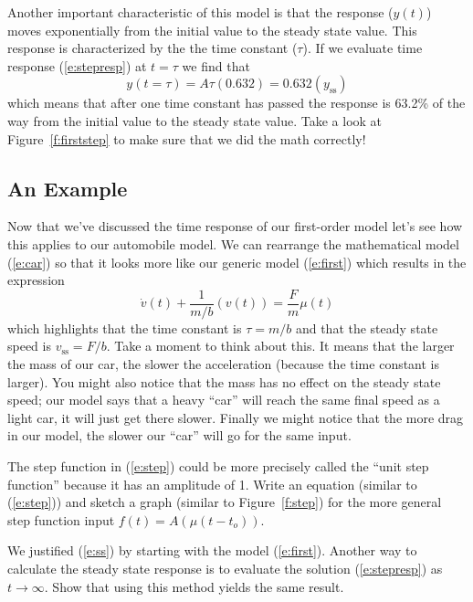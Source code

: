 Another important characteristic of this model is that the response ($y(t)$) moves exponentially from the initial value to the steady state value.  This response is characterized by the the \gls{time constant} ($\tau$).  If we evaluate time response (\ref{e:stepresp}) at $t=\tau$ we find that
\[
y(t=\tau) = A \tau (0.632) = 0.632 (y_{\mathrm{ss}})
\]
which means that after one time constant has passed the response is 63.2\% of the way from the initial value to the steady state value.  Take a look at Figure~\ref{f:firststep} to make sure that we did the math correctly!

\subsection{An Example}
Now that we've discussed the time response of our first-order model let's see how this applies to our automobile model.  We can rearrange the mathematical model (\ref{e:car}) so that it looks more like our generic model (\ref{e:first}) which results in the expression
\begin{equation}\label{e:car2}
\dot{v}(t) + \frac{1}{m/b}(v(t)) = \frac{F}{m}\mu(t)
\end{equation}
which highlights that the time constant is $\tau=m/b$ and that the steady state speed is $v_{\mathrm{ss}}=F/b$.  Take a moment to think about this.  It means that the larger the mass of our car, the slower the acceleration (because the time constant is larger).  You might also notice that the mass has no effect on the steady state speed; our model says that a heavy ``car'' will reach the same final speed as a light car, it will just get there slower.  Finally we might notice that the more drag in our model, the slower our ``car'' will go for the same input.   

\begin{ex}
The step function in (\ref{e:step}) could be more precisely called the ``unit step function'' because it has an amplitude of 1.  Write an equation (similar to (\ref{e:step})) and sketch a graph (similar to Figure~\ref{f:step}) for the more general step function input $f(t) = A(\mu(t-t_o))$.
\end{ex}

\begin{ex}
We justified (\ref{e:ss}) by starting with the model (\ref{e:first}).  Another way to calculate the steady state response is to evaluate the solution (\ref{e:stepresp}) as $t \to \infty$.  Show that using this method yields the same result.
\end{ex}

